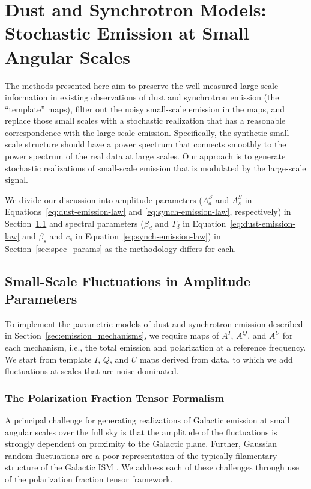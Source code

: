 \documentclass[twocolumn]{aastex631}
\begin{document}
\section{Dust and Synchrotron Models: Stochastic Emission at Small Angular Scales} \label{sec:small_scales}
The methods presented here aim to preserve the well-measured large-scale information in existing observations of dust and synchrotron emission (the ``template'' maps), filter out the noisy small-scale emission in the maps, and replace those small scales with a stochastic realization that has a reasonable correspondence with the large-scale emission. Specifically, the synthetic small-scale structure should have a power spectrum that connects smoothly to the power spectrum of the real data at large scales. Our approach is to generate stochastic realizations of small-scale emission that is modulated by the large-scale signal.

We divide our discussion into amplitude parameters ($A_d^S$ and $A_s^S$ in Equations~\ref{eq:dust-emission-law} and \ref{eq:synch-emission-law}, respectively) in Section~\ref{sec:amp_params} and spectral parameters ($\beta_d$ and $T_d$ in Equation~\ref{eq:dust-emission-law} and $\beta_s$ and $c_s$ in Equation~\ref{eq:synch-emission-law}) in Section~\ref{sec:spec_params} as the methodology differs for each.

\subsection{Small-Scale Fluctuations in Amplitude Parameters} \label{sec:amp_params}
To implement the parametric models of dust and synchrotron emission described in Section~\ref{sec:emission_mechanisms}, we require maps of $A^I$, $A^Q$, and $A^U$ for each mechanism, i.e., the total emission and polarization at a reference frequency. We start from template $I$, $Q$, and $U$ maps derived from data, to which we add fluctuations at scales that are noise-dominated.

\subsubsection{The Polarization Fraction Tensor Formalism} \label{sec:polfrac}
A principal challenge for generating realizations of Galactic emission at small angular scales over the full sky is that the amplitude of the fluctuations is strongly dependent on proximity to the Galactic plane. Further, Gaussian random fluctuations are a poor representation of the typically filamentary structure of the Galactic ISM \citep[e.g.,][]{Hacar:2023}. We address each of these challenges through use of the polarization fraction tensor framework.
\end{document}
